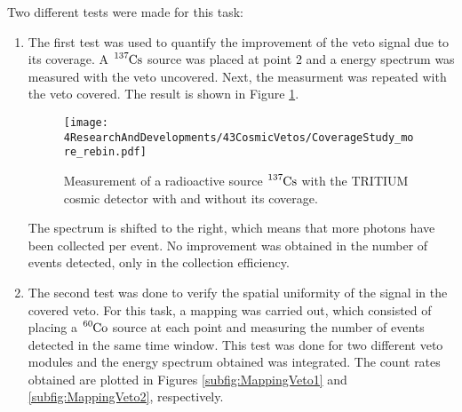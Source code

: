 Two different tests were made for this task:
\begin{enumerate}

\item{} The first test was used to quantify the improvement of the veto signal due to its coverage. A $\ce{^{137}Cs}$ source was placed at point 2 and a energy spectrum was measured with the veto uncovered. Next, the measurment was repeated with the veto covered. The result is shown in Figure \ref{fig:VetoCoverageImprovement}.

\begin{figure}[h]
\centering
\texttt{[image: 4ResearchAndDevelopments/43CosmicVetos/CoverageStudy\_more\_rebin.pdf]}
\caption{Measurement of a radioactive source $\ce{^{137}Cs}$ with the TRITIUM cosmic detector with and without its coverage.\label{fig:VetoCoverageImprovement}}
\end{figure}

The spectrum is shifted to the right, which means that more photons have been collected per event. No improvement was obtained in the number of events detected, only in the collection efficiency.


\item{} The second test was done to verify the spatial uniformity of the signal in the covered veto. For this task, a mapping was carried out, which consisted of placing a $\ce{^{60}Co}$ source at each point and measuring the number of events detected in the same time window. This test was done for two different veto modules and the energy spectrum obtained was integrated. The count rates obtained are plotted in Figures \ref{subfig:MappingVeto1} and \ref{subfig:MappingVeto2}, respectively.


\end{enumerate}

